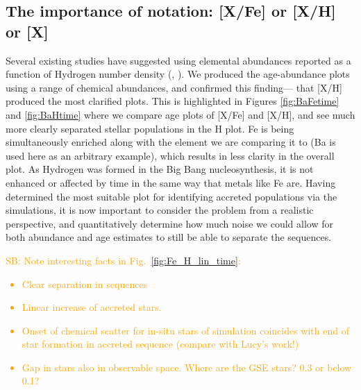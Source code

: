 \documentclass[fleqn,usenatbib]{mnras}
\newcommand{\SB}[1]{{\textcolor{orange}{SB: #1}}}
\begin{document}
\subsection{The importance of notation: [X/Fe] or [X/H] or [X]}
Several existing studies have suggested using elemental abundances reported as a function of Hydrogen number density (\citet{Fuhrmann2017}, \citet{Feuillet2021}). We produced the age-abundance plots using a range of chemical abundances, and confirmed this finding— that [X/H] produced the most clarified plots. This is highlighted in Figures \ref{fig:BaFetime} and \ref{fig:BaHtime} where we compare age plots of [X/Fe] and [X/H], and see much more clearly separated stellar populations in the H plot. Fe is being simultaneously enriched along with the element we are comparing it to (Ba is used here as an arbitrary example), which results in less clarity in the overall plot. As Hydrogen was formed in the Big Bang nucleosynthesis, it is not enhanced or affected by time in the same way that metals like Fe are. Having determined the most suitable plot for identifying accreted populations via the simulations, it is now important to consider the problem from a realistic perspective, and quantitatively determine how much noise we could allow for both abundance and age estimates to still be able to separate the sequences. \par 

\SB{Note interesting facts in Fig.~\ref{fig:Fe_H_lin_time}:
\begin{itemize}
    \item Clear separation in sequences
    \item Linear increase of accreted stars.
    \item Onset of chemical scatter for in-situ stars of simulation coincides with end of star formation in accreted sequence (compare with Lucy's work!)
    \item Gap in stars also in observable space. Where are the GSE stars? 0.3 or below 0.1?
\end{itemize}
}

\end{document}
